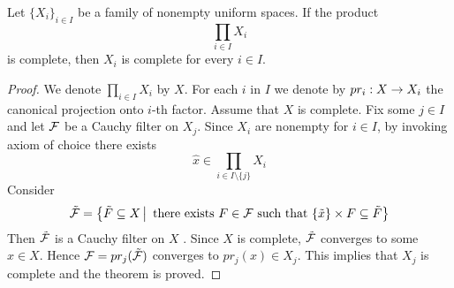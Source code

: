 \begin{theorem}\label{theorem:complete_and_nonempty_product_implies_each_factor_is_complete}
	Let $\big\{X_i\big\}_{i\in I}$ be a family of nonempty uniform spaces. If the product
	$$\prod_{i\in I}X_i$$
	is complete, then $X_i$ is complete for every $i\in I$.
\end{theorem}
\begin{proof}
	We denote $\prod_{i\in I}X_i$ by $X$. For each $i$ in $I$ we denote by $pr_i:X \rightarrow X_i$ the canonical projection onto $i$-th factor. Assume that $X$ is complete. Fix some $j \in I$ and let ${\mathcal F}$ be a Cauchy filter on $X_j$. Since $X_i$ are nonempty for $i \in I$, by invoking axiom of choice there exists
	$$\hat{x} \in \prod_{i \in I\setminus \{j\}}X_i$$
	Consider
	$$\tilde{{\mathcal F}} = \big\{\tilde{F} \subseteq X\,\big|\,\mbox{ there exists }F\in {\mathcal F}\mbox{ such that }\{\tilde{x}\}\times F \subseteq \tilde{F}\big\}$$
	Then $\tilde{{\mathcal F}}$ is a Cauchy filter on $X$ . Since $X$ is complete, $\tilde{{\mathcal F}}$ converges to some $x \in X$. Hence ${\mathcal F} = pr_j(\tilde{{\mathcal F}})$ converges to $pr_j(x) \in X_j$. This implies that $X_j$ is complete and the theorem is proved.
\end{proof}

